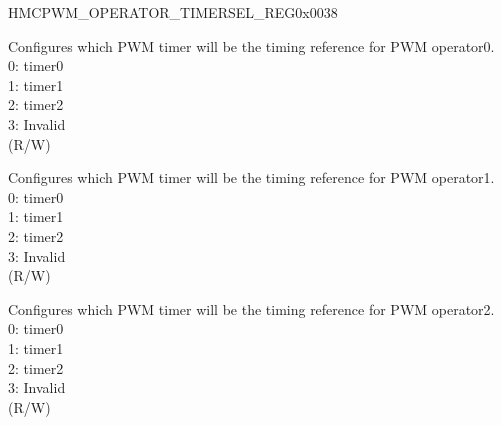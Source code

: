\begin{register}{H}{MCPWM\_OPERATOR\_TIMERSEL\_REG}{0x0038}\label{regdesc:MCPWMOPERATORTIMERSELREG}
%
%
%
%
\regnewline%
\begin{regdesc}\begin{reglist}
\label{fielddesc:MCPWMOPERATOR0TIMERSEL}\item [MCPWM\_OPERATOR0\_TIMERSEL] Configures which PWM timer will be the timing reference for PWM operator0.\\
0: timer0 \\
1: timer1 \\
2: timer2 \\
3: Invalid \\
(R/W)
\label{fielddesc:MCPWMOPERATOR1TIMERSEL}\item [MCPWM\_OPERATOR1\_TIMERSEL] Configures which PWM timer will be the timing reference for PWM operator1.
\\0: timer0 \\
1: timer1 \\
2: timer2 \\
3: Invalid \\
(R/W)
\label{fielddesc:MCPWMOPERATOR2TIMERSEL}\item [MCPWM\_OPERATOR2\_TIMERSEL] Configures which PWM timer will be the timing reference for PWM operator2.\\
0: timer0 \\
1: timer1 \\
2: timer2 \\
3: Invalid \\
(R/W)
\end{reglist}\end{regdesc}
\end{register}


